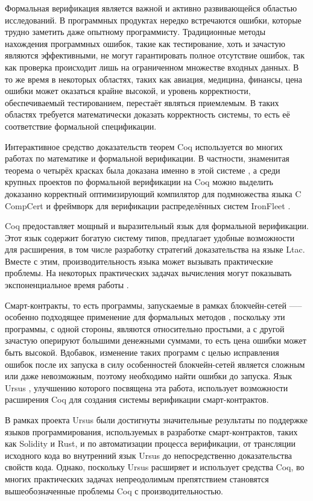 \documentclass[../thesis.tex]{subfiles}
\begin{document}
 \label{sec:introduction}

Формальная верификация является важной и активно развивающейся областью исследований. В программных продуктах нередко встречаются ошибки, которые трудно заметить даже опытному программисту. Традиционные методы нахождения программных ошибок, такие как тестирование, хоть и зачастую являются эффективными, не могут гарантировать полное отсутствие ошибок, так как проверка происходит лишь на ограниченном множестве входных данных. В то же время в некоторых областях, таких как авиация, медицина, финансы, цена ошибки может оказаться крайне высокой, и уровень корректности, обеспечиваемый тестированием, перестаёт являться приемлемым. В таких областях требуется математически доказать корректность системы, то есть её соответствие формальной спецификации.

Интерактивное средство доказательств теорем Coq \cite{coq} используется во многих работах по математике и формальной верификации. В частности, знаменитая теорема о четырёх красках была доказана именно в этой системе \cite{4colors}, а среди крупных проектов по формальной верификации на Coq можно выделить доказанно корректный оптимизирующий компилятор для подмножества языка C CompCert \cite{compcert} и фреймворк для верификации распределённых систем IronFleet \cite{ironfleet}.

Coq предоставляет мощный и выразительный язык для формальной верификации. Этот язык содержит богатую систему типов, предлагает удобные возможности для расширения, в том числе разработку стратегий доказательства на языке Ltac. Вместе с этим, производительность языка может вызывать практические проблемы. На некоторых практических задачах вычисления могут показывать экспоненциальное время работы \cite{coqslow} \cite{gross_phd}.

Смарт-контракты, то есть программы, запускаемые в рамках блокчейн-сетей —-- особенно подходящее применение для формальных методов \cite{smart_contracts}, поскольку эти программы, с одной стороны, являются относительно простыми, а с другой зачастую оперируют большими денежными суммами, то есть цена ошибки может быть высокой. Вдобавок, изменение таких программ с целью исправления ошибок после их запуска в силу особенностей блокчейн-сетей является сложным или даже невозможным, поэтому необходимо найти ошибки до запуска. Язык Ursus \cite{ursus}, улучшению которого посвящена эта работа, использует возможности расширения Coq для создания системы верификации смарт-контрактов. 

В рамках проекта Ursus были достигнуты значительные результаты по поддержке языков программирования, используемых в разработке смарт-контрактов, таких как Solidity и Rust, и по автоматизации процесса верификации, от трансляции исходного кода во внутренний язык Ursus до непосредственно доказательства свойств кода. Однако, поскольку Ursus расширяет и использует средства Coq, во многих практических задачах непреодолимым препятствием становятся вышеобозначенные проблемы Coq с производительностью.
\end{document}
